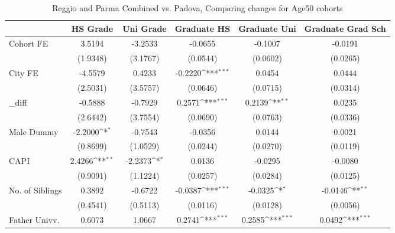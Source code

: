 \begin{table}[htbp]\centering
\def\sym#1{\ifmmode^{#1}\else\(^{#1}\)\fi}
\caption{Reggio and Parma Combined vs. Padova, Comparing changes for Age50 cohorts}
\begin{tabular}{l*{5}{c}}
\toprule
            &\multicolumn{1}{c}{HS Grade}&\multicolumn{1}{c}{Uni Grade}&\multicolumn{1}{c}{Graduate HS}&\multicolumn{1}{c}{Graduate Uni}&\multicolumn{1}{c}{Graduate Grad Sch}\\
\midrule
Cohort FE   &      3.5194         &     -3.2533         &     -0.0655         &     -0.1007         &     -0.0191         \\
            &    (1.9348)         &    (3.1767)         &    (0.0544)         &    (0.0602)         &    (0.0265)         \\
\addlinespace
City FE     &     -4.5579         &      0.4233         &     -0.2220\sym{***}&      0.0454         &      0.0444         \\
            &    (2.5031)         &    (3.5757)         &    (0.0646)         &    (0.0715)         &    (0.0314)         \\
\addlinespace
\_diff       &     -0.5888         &     -0.7929         &      0.2571\sym{***}&      0.2139\sym{**} &      0.0235         \\
            &    (2.6442)         &    (3.7554)         &    (0.0690)         &    (0.0763)         &    (0.0336)         \\
\addlinespace
Male Dummy  &     -2.2000\sym{*}  &     -0.7543         &     -0.0356         &      0.0144         &      0.0021         \\
            &    (0.8699)         &    (1.0529)         &    (0.0244)         &    (0.0270)         &    (0.0119)         \\
\addlinespace
CAPI        &      2.4266\sym{**} &     -2.2373\sym{*}  &      0.0136         &     -0.0295         &     -0.0080         \\
            &    (0.9091)         &    (1.1224)         &    (0.0257)         &    (0.0284)         &    (0.0125)         \\
\addlinespace
No. of Siblings&      0.3892         &     -0.6722         &     -0.0387\sym{***}&     -0.0325\sym{*}  &     -0.0146\sym{**} \\
            &    (0.4541)         &    (0.5113)         &    (0.0116)         &    (0.0128)         &    (0.0056)         \\
\addlinespace
Father Univv.&      0.6073         &      1.0667         &      0.2741\sym{***}&      0.2585\sym{***}&      0.0492\sym{***}\\

\end{tabular}
\end{table}
